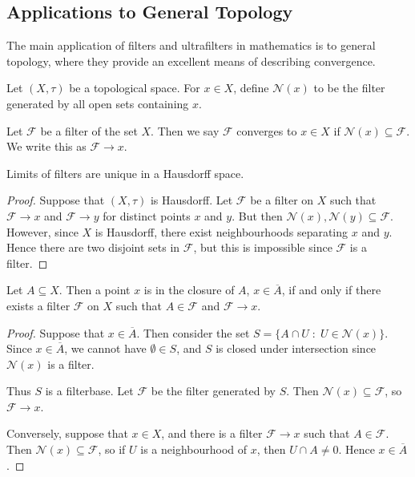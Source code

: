 \subsection{Applications to General Topology}
The main application of filters and ultrafilters in mathematics is to 
general topology, where they provide an excellent means of describing convergence.

Let $(X,\tau)$ be a topological space. For $x \in X$, define
$\mathcal{N}(x)$ to be the filter generated by all open sets containing $x$.

\begin{definition}
    Let $\mathcal{F}$ be a filter of the set $X$. Then we say $\mathcal{F}$
    converges to $x \in X$ if $\mathcal{N}(x) \subseteq \mathcal{F}$. We
    write this as $\mathcal{F} \rightarrow x$.
\end{definition}

\begin{proposition}
    Limits of filters are unique in a Hausdorff space.
\end{proposition}
\begin{proof}
    Suppose that $(X,\tau)$ is Hausdorff. Let $\mathcal{F}$
    be a filter on $X$ such that $\mathcal{F} \rightarrow x$
    and $\mathcal{F}\rightarrow y$ for distinct points
    $x$ and $y$. But then $\mathcal{N}(x), \mathcal{N}(y) \subseteq \mathcal{F}$.
    However, since $X$ is Hausdorff, there exist neighbourhoods separating
    $x$ and $y$. Hence there are two disjoint sets in $\mathcal{F}$,
    but this is impossible since $\mathcal{F}$ is a filter.
\end{proof} 

\begin{proposition}
    Let $A \subseteq X$. Then a point $x$ is in the closure of $A$,
    $x \in \overline{A}$, if and only if there exists
    a filter $\mathcal{F}$ on $X$ such that $A \in \mathcal{F}$
    and $\mathcal{F} \rightarrow x$. 
\end{proposition}
\begin{proof}
    Suppose that $x \in \overline{A}$. Then consider
    the set $S = \{A \cap U\;:\;U \in \mathcal{N}(x)\}$. Since
    $x \in \overline{A}$, we cannot have $\emptyset \in S$,
    and $S$ is closed under intersection since $\mathcal{N}(x)$
    is a filter.

    Thus $S$ is a filterbase. Let $\mathcal{F}$ be the filter
    generated by $S$. Then $\mathcal{N}(x) \subseteq \mathcal{F}$,
    so $\mathcal{F} \rightarrow x$.

    Conversely, suppose that $x \in X$, and there is a filter
    $\mathcal{F} \rightarrow x$ such that $A \in \mathcal{F}$. 
    Then $\mathcal{N}(x) \subseteq \mathcal{F}$, 
    so if $U$ is a neighbourhood of $x$, then $U\cap A \neq 0$. 
    Hence $x \in \overline{A}$.
\end{proof}

